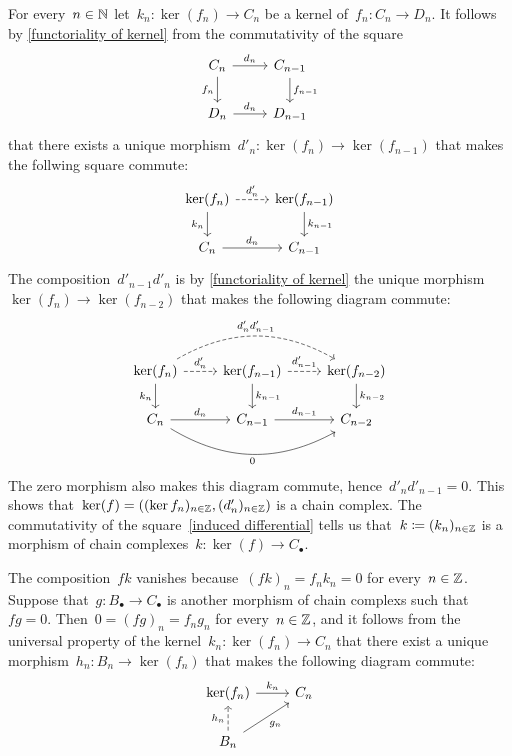 For every~$n \in \mathbb{N}$ let~$k_n \colon \ker(f_n) \to C_n$ be a kernel of~$f_n \colon C_n \to D_n$.
It follows by \cref{functoriality of kernel} from the commutativity of the square
\[
  \begin{tikzcd}
      C_n
      \arrow{r}[above]{d_n}
      \arrow{d}[left]{f_n}
    & C_{n-1}
      \arrow{d}[right]{f_{n-1}}
    \\
      D_n
      \arrow{r}[above]{d_n}
    & D_{n-1}
  \end{tikzcd}
\]
that there exists a unique morphism~$d'_n \colon \ker(f_n) \to \ker(f_{n-1})$ that makes the follwing square commute:
\begin{equation}
  \label{induced differential}
  \begin{tikzcd}
      \ker(f_n)
      \arrow[dashed]{r}[above]{d'_n}
      \arrow{d}[left]{k_n}
    & \ker(f_{n-1})
      \arrow{d}[right]{k_{n-1}}
    \\
      C_n
      \arrow{r}[above]{d_n}
    & C_{n-1}
  \end{tikzcd}
\end{equation}
The composition~$d'_{n-1} d'_n$ is by \cref{functoriality of kernel} the unique morphism~$\ker(f_n) \to \ker(f_{n-2})$ that makes the following diagram commute:
\[
  \begin{tikzcd}
      \ker(f_n)
      \arrow[dashed, bend left]{rr}[above]{d'_n d'_{n-1}}
      \arrow[dashed]{r}[above]{d'_n}
      \arrow{d}[left]{k_n}
    & \ker(f_{n-1})
      \arrow[dashed]{r}[above]{d'_{n-1}}
      \arrow{d}[right]{k_{n-1}}
    & \ker(f_{n-2})
      \arrow{d}[right]{k_{n-2}}
    \\
      C_n
      \arrow{r}[above]{d_n}
      \arrow[bend right]{rr}[below]{0}
    & C_{n-1}
      \arrow{r}[above]{d_{n-1}}
    & C_{n-2}
  \end{tikzcd}
\]
The zero morphism also makes this diagram commute, hence~$d'_n d'_{n-1} = 0$.
This shows that~$\ker(f) = ((\ker f_n)_{n \in \mathbb{Z}}, (d'_n)_{n \in \mathbb{Z}})$ is a chain complex.
The commutativity of the square~\eqref{induced differential} tells us that~$k \coloneqq (k_n)_{n \in \mathbb{Z}}$ is a morphism of chain complexes~$k \colon \ker(f) \to C_\bullet$.

The composition~$f k$ vanishes because~$(fk)_n = f_n k_n = 0$ for every~$n \in \mathbb{Z}$.
Suppose that~$g \colon B_\bullet \to C_\bullet$ is another morphism of chain complexs such that~$f g = 0$.
Then~$0 = (fg)_n = f_n g_n$ for every~$n \in \mathbb{Z}$, and it follows from the universal property of the kernel~$k_n \colon \ker(f_n) \to C_n$ that there exist a unique morphism~$h_n \colon B_n \to \ker(f_n)$ that makes the following diagram commute:
\begin{equation}
  \label{constructing triangle}
  \begin{tikzcd}
      \ker(f_n)
      \arrow{r}[above]{k_n}
    & C_n
    \\
      B_n
      \arrow[dashed]{u}[left]{h_n}
      \arrow{ur}[below right]{g_n}
    & {}
  \end{tikzcd}
\end{equation}

